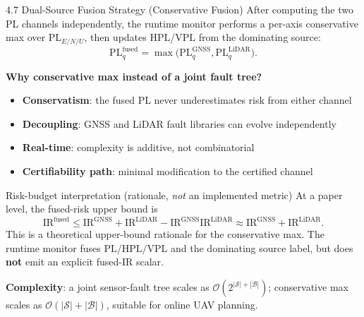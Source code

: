 \documentclass[10pt,aspectratio=169,xcolor=dvipsnames]{beamer}
\newcommand{\PL}{\mathrm{PL}}
\newcommand{\HPL}{\mathrm{HPL}}
\newcommand{\VPL}{\mathrm{VPL}}
\newcommand{\IR}{\mathrm{IR}}
\newcommand{\1}{\mathbb{1}}
\begin{document}
\begin{frame}[t]{4.7 Dual-Source Fusion Strategy (Conservative Fusion)}
  \scriptsize
  \vspace{-2pt}
  \setlength{\abovedisplayskip}{3pt}
  \setlength{\belowdisplayskip}{3pt}
  \setlength{\abovedisplayshortskip}{2pt}
  \setlength{\belowdisplayshortskip}{2pt}
  After computing the two PL channels independently, the runtime monitor performs a per-axis conservative max over $\PL_{E/N/U}$, then updates $\HPL$/$\VPL$ from the dominating source:
  {\footnotesize
    \[
      \PL_q^{\mathrm{fused}}=\max\!\bigl(\PL_q^{\mathrm{GNSS}},\PL_q^{\mathrm{LiDAR}}\bigr).
  \]}

  \textbf{Why conservative max instead of a joint fault tree?}
  \begin{itemize}\tiny
      \setlength{\itemsep}{1pt}
    \item \textbf{Conservatism}: the fused PL never underestimates risk from either channel
    \item \textbf{Decoupling}: GNSS and LiDAR fault libraries can evolve independently
    \item \textbf{Real-time}: complexity is additive, not combinatorial
    \item \textbf{Certifiability path}: minimal modification to the certified channel
  \end{itemize}

  \vspace{1pt}
  \begin{alertblock}{\scriptsize Risk-budget interpretation (rationale, \emph{not} an implemented metric)}
    \tiny
    At a paper level, the fused-risk upper bound is
    {\footnotesize
      \[
        \IR^{\mathrm{fused}}\le \IR^{\mathrm{GNSS}}+\IR^{\mathrm{LiDAR}}-\IR^{\mathrm{GNSS}}\IR^{\mathrm{LiDAR}}
        \approx \IR^{\mathrm{GNSS}}+\IR^{\mathrm{LiDAR}}.
    \]}
    This is a theoretical upper-bound rationale for the conservative max. The runtime monitor fuses $\PL/\HPL/\VPL$ and the dominating source label, but does \textbf{not} emit an explicit fused-IR scalar.
  \end{alertblock}

  \tiny \textbf{Complexity}: a joint sensor-fault tree scales as $\mathcal{O}(2^{|\mathcal{S}|+|\mathcal{B}|})$; conservative max scales as $\mathcal{O}(|\mathcal{S}|+|\mathcal{B}|)$, suitable for online UAV planning.
\end{frame}
\end{document}

